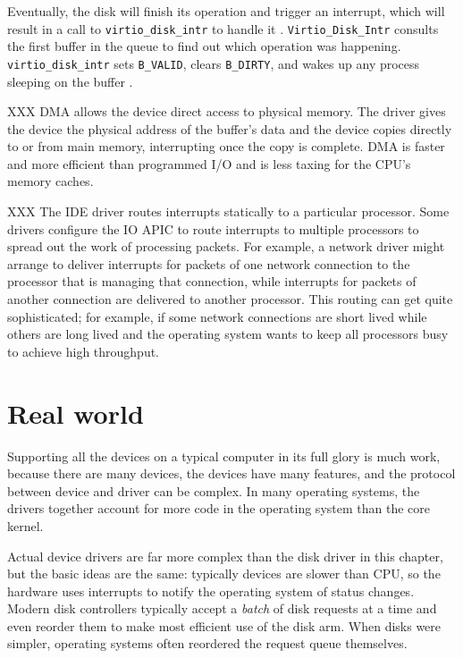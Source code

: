 Eventually, the disk will finish its operation and trigger an
interrupt, which will result in a call to
\lstinline{virtio_disk_intr}
to handle it
.
\lstinline{Virtio_Disk_Intr}
consults the first buffer in the queue to find
out which operation was happening.
\lstinline{virtio_disk_intr}
sets 
\lstinline{B_VALID},
clears
\lstinline{B_DIRTY},
and wakes up any process sleeping on the buffer
.

XXX DMA allows the device direct access to physical memory.
The driver gives the device the physical address of the buffer's data and
the device copies directly to or from main memory,
interrupting once the copy is complete.
DMA is faster and more efficient than programmed I/O
and is less taxing for the CPU's memory caches.

XXX The IDE driver routes interrupts statically to a particular processor.  Some
drivers configure the IO APIC
to route interrupts to multiple processors to spread out
the work of processing packets.
For example, a network driver might arrange to deliver interrupts
for packets of one network connection to the processor that is managing that
connection, while interrupts for packets of another connection are delivered to
another processor.  This routing can get quite sophisticated; for example, if
some network connections are short lived while others are long lived and the
operating system wants to keep all processors busy to achieve high throughput.


\section{Real world}

Supporting all the devices on a typical computer in its full glory is
much work, because there are many devices, the devices have many
features, and the protocol between device and driver can be complex.
In many operating systems, the drivers together account for more code
in the operating system than the core kernel.

Actual device drivers are far more complex than the disk driver in this chapter,
but the basic ideas are the same:
typically devices are slower than CPU, so the hardware uses
interrupts to notify the operating system of status changes.
Modern disk controllers typically
accept a 
\textit{batch} 
of disk requests at a time and even reorder
them to make most efficient use of the disk arm.
When disks were simpler, operating systems often reordered the
request queue themselves.

